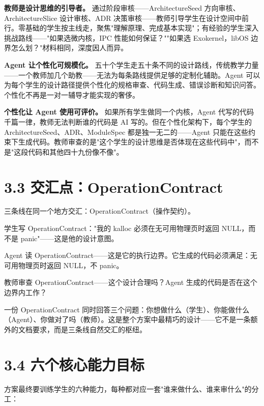 \documentclass[UTF8,a4paper,12pt,openany]{ctexrep}
\begin{document}
\textbf{教师是设计思维的引导者。} 通过阶段审核------ArchitectureSeed 方向审核、ArchitectureSlice 设计审核、ADR 决策审核------教师引导学生在设计空间中前行。零基础的学生按主线走，聚焦"理解原理、完成基本实现"；有经验的学生深入挑战路线------"如果选微内核，IPC 性能如何保证？""如果选 Exokernel，libOS 边界怎么划？"材料相同，深度因人而异。

\textbf{Agent 让个性化可规模化。} 五十个学生走五十条不同的设计路线，传统教学力量------一个教师加几个助教------无法为每条路线提供足够的定制化辅助。Agent 可以为每个学生的设计路径提供个性化的规格审查、代码生成、错误诊断和知识问答。个性化不再是一对一辅导才能实现的奢侈。

\textbf{个性化让 Agent 使用可评价。} 如果所有学生做同一个内核，Agent 代写的代码千篇一律，教师无法判断谁的代码是 AI 写的。但在个性化架构下，每个学生的 ArchitectureSeed、ADR、ModuleSpec 都是独一无二的------Agent 只能在这些约束下生成代码。教师审查的是"这个学生的设计思维是否体现在这些代码中"，而不是"这段代码和其他四十九份像不像"。

\section{3.3 交汇点：OperationContract}\label{33-ux4ea4ux6c47ux70b9operationcontract}

三条线在同一个地方交汇：OperationContract（操作契约）。

学生写 OperationContract："我的 kalloc 必须在无可用物理页时返回 NULL，而不是 panic"------这是他的设计意图。

Agent 读 OperationContract------这是它的执行边界。它生成的代码必须满足：无可用物理页时返回 NULL，不 panic。

教师审查 OperationContract------这个设计合理吗？Agent 生成的代码是否在这个边界内工作？

一份 OperationContract 同时回答三个问题：你想做什么（学生）、你能做什么（Agent）、你做对了吗（教师）。这是整个方案中最精巧的设计------它不是一条额外的文档要求，而是三条线自然交汇的枢纽。

\section{3.4 六个核心能力目标}\label{34-ux516dux4e2aux6838ux5fc3ux80fdux529bux76eeux6807}

方案最终要训练学生的六种能力，每种都对应一套"谁来做什么、谁来审什么"的分工：
\end{document}
